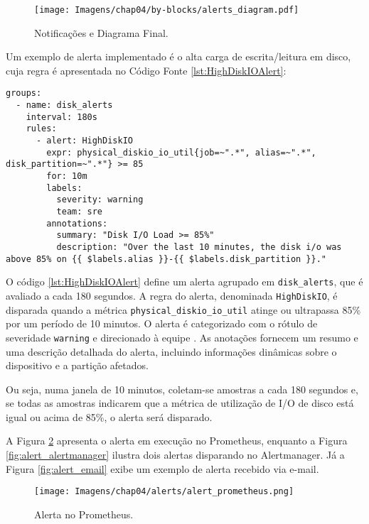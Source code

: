 \begin{figure}[H]
\centering
\setlength{\abovecaptionskip}{-20pt}
\texttt{[image: Imagens/chap04/by-blocks/alerts\_diagram.pdf]}
\caption{Notificações e Diagrama Final.}
\label{fig:DiagramaAlertas}
\end{figure}

Um exemplo de alerta implementado é o alta carga de escrita/leitura em disco, cuja regra é apresentada no Código Fonte \ref{lst:HighDiskIOAlert}:

\newpage

\begin{lstlisting}[caption={Alerta para alta carga de escrita/leitura em disco}, label={lst:HighDiskIOAlert}]
groups:
  - name: disk_alerts
    interval: 180s
    rules:
      - alert: HighDiskIO
        expr: physical_diskio_io_util{job=~".*", alias=~".*", disk_partition=~".*"} >= 85
        for: 10m
        labels:
          severity: warning
          team: sre
        annotations:
          summary: "Disk I/O Load >= 85%"
          description: "Over the last 10 minutes, the disk i/o was above 85% on {{ $labels.alias }}-{{ $labels.disk_partition }}."
\end{lstlisting}

O código \ref{lst:HighDiskIOAlert} define um alerta agrupado em \verb|disk_alerts|, que é avaliado a cada 180 segundos. A regra do alerta, denominada \verb|HighDiskIO|, é disparada quando a métrica \verb|physical_diskio_io_util| atinge ou ultrapassa 85\% por um período de 10 minutos. O alerta é categorizado com o rótulo de severidade \verb|warning| e direcionado à equipe . As anotações fornecem um resumo e uma descrição detalhada do alerta, incluindo informações dinâmicas sobre o dispositivo e a partição afetados.

Ou seja, numa janela de 10 minutos, coletam-se amostras a cada 180 segundos e, se todas as amostras indicarem que a métrica de utilização de I/O de disco está igual ou acima de 85\%, o alerta será disparado.

A Figura \ref{fig:alert_prometheus} apresenta o alerta em execução no Prometheus, enquanto a Figura \ref{fig:alert_alertmanager} ilustra dois alertas disparando no Alertmanager. Já a Figura \ref{fig:alert_email} exibe um exemplo de alerta recebido via e-mail. 
\begin{figure}[H]
\centering
\setlength{\abovecaptionskip}{-20pt}
\texttt{[image: Imagens/chap04/alerts/alert\_prometheus.png]}
\caption{Alerta no Prometheus.}
\label{fig:alert_prometheus}
\end{figure}

